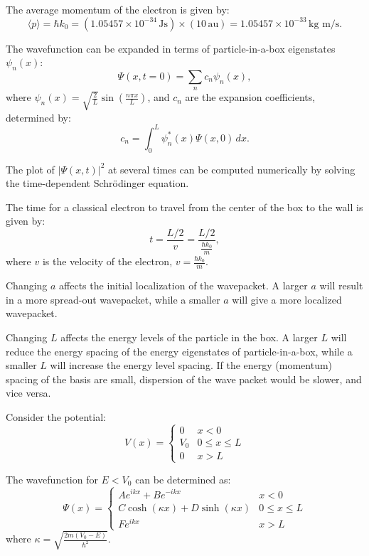 \documentclass{article}
\begin{document}
The average momentum of the electron is given by:
\[
\langle p \rangle = \hbar k_0 = (1.05457 \times 10^{-34} \, \text{Js}) \times (10 \, \text{au}) = 1.05457 \times 10^{-33} \, \text{kg m/s}.
\]

The wavefunction can be expanded in terms of particle-in-a-box eigenstates $\psi_n(x)$:
\[
\Psi(x, t = 0) = \sum_{n} c_n \psi_n(x),
\]
where $\psi_n(x) = \sqrt{\frac{2}{L}} \sin\left(\frac{n \pi x}{L}\right)$, and $c_n$ are the expansion coefficients, determined by:
\[
c_n = \int_{0}^{L} \psi^*_n(x)  \Psi(x, 0) \, dx.
\]

The plot of $|\Psi(x, t)|^2$ at several times can be computed numerically by solving the time-dependent Schrödinger equation.

The time for a classical electron to travel from the center of the box to the wall is given by:
\[
t = \frac{L/2}{v} = \frac{L/2}{\frac{\hbar k_0}{m}},
\]
where $v$ is the velocity of the electron, $v = \frac{\hbar k_0}{m}$.

Changing $a$ affects the initial localization of the wavepacket. A larger $a$ will result in a more spread-out wavepacket, while a smaller $a$ will give a more localized wavepacket.

Changing $L$ affects the energy levels of the particle in the box. A larger $L$ will reduce the energy spacing of the energy eigenstates of particle-in-a-box, while a smaller $L$ will increase the energy level spacing. If the energy (momentum) spacing of the basis are small, dispersion of the wave packet would be slower, and vice versa.\\



Consider the potential:
\[
V(x) = 
\begin{cases} 
    0 & x < 0 \\
    V_0 & 0 \leq x \leq L \\
    0 & x > L
\end{cases}
\]

The wavefunction for $E < V_0$ can be determined as:
\[
\Psi(x) = 
\begin{cases} 
    Ae^{ikx} + Be^{-ikx} & x < 0 \\
    C \cosh(\kappa x) + D \sinh(\kappa x) & 0 \leq x \leq L \\
    Fe^{ikx} & x > L
\end{cases}
\]
where $\kappa = \sqrt{\frac{2m(V_0 - E)}{\hbar^2}}$.
\end{document}

